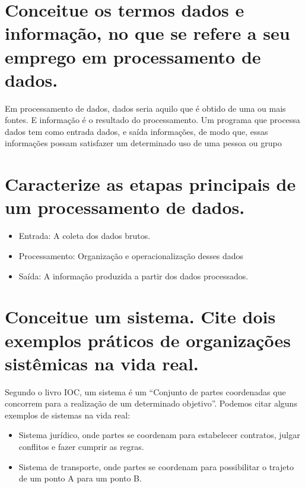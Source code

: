 \documentclass[
	12pt,				%
	openright,			%
	twoside,			%
	a4paper,			%
	english,			%
	french,				%
	spanish,			%
	brazil				%
	]{abntex2}
\author{Gustavo de Paula}
\date{\today}
\title{}
\begin{document}
\imprimircapa
\imprimirfolhaderosto
\tableofcontents


\section{Conceitue os termos dados e informação, no que se refere a seu emprego em processamento de dados.}
\label{sec:org6d37a78}
Em processamento de dados, dados seria aquilo que é obtido de uma ou mais
fontes. E informação é o resultado do processamento. Um programa que processa
dados tem como entrada dados, e saída informações, de modo que, essas
informações possam satisfazer um determinado uso de uma pessoa ou grupo
\section{Caracterize as etapas principais de um processamento de dados.}
\label{sec:orgb71df10}
\begin{itemize}
\item Entrada: A coleta dos dados brutos.
\item Processamento: Organização e operacionalização desses dados
\item Saída: A informação produzida a partir dos dados processados.
\end{itemize}
\section{Conceitue um sistema. Cite dois exemplos práticos de organizações sistêmicas na vida real.}
\label{sec:org33fce1e}
Segundo o livro IOC, um sistema é um “Conjunto de partes coordenadas que
concorrem para a realização de um determinado objetivo”. Podemos citar alguns
exemplos de sistemas na vida real:
\begin{itemize}
\item Sistema jurídico, onde partes se coordenam para estabelecer contratos, julgar
conflitos e fazer cumprir as regras.
\item Sistema de transporte, onde partes se coordenam para possibilitar o trajeto de
um ponto A para um ponto B.
\end{itemize}
\end{document}
